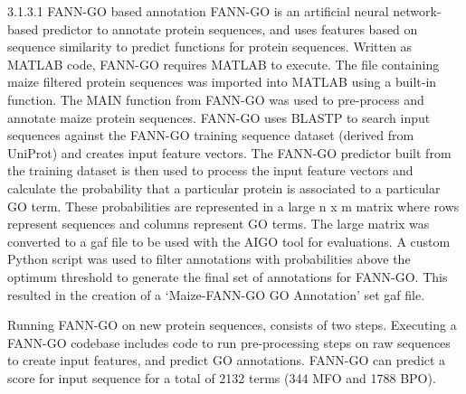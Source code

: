 3.1.3.1 FANN-GO based annotation
	FANN-GO is an artificial neural network-based predictor to annotate protein sequences, and uses features based on sequence similarity to predict functions for protein sequences.
Written as MATLAB code, FANN-GO requires MATLAB to execute. The file containing maize filtered protein sequences was imported into MATLAB using a built-in function. The MAIN function from FANN-GO was used to pre-process and annotate maize protein sequences. FANN-GO uses BLASTP to search input sequences against the FANN-GO training sequence dataset (derived from UniProt) and creates input feature vectors. The FANN-GO predictor built from the training dataset is then used to process the input feature vectors and calculate the probability that a particular protein is associated to a particular GO term. These probabilities are represented in a large n x m matrix where rows represent sequences and columns represent GO terms. The large matrix was converted to a gaf file to be used with the AIGO tool for evaluations. A custom Python script was used to filter annotations with probabilities above the optimum threshold to generate the final set of annotations for FANN-GO. This resulted in the creation of a ‘Maize-FANN-GO GO Annotation’ set gaf file.




Running FANN-GO on new protein sequences, consists of two steps. Executing a FANN-GO codebase includes code to run pre-processing steps on raw sequences to create input features, and predict GO annotations.  FANN-GO can predict a score for input sequence for a total of 2132 terms (344 MFO and 1788 BPO).

